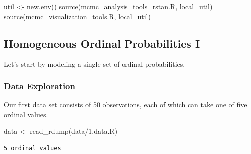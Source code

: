 \documentclass[
  letterpaper,
  DIV=11,
  numbers=noendperiod]{scrartcl}
\newenvironment{Shaded}{\begin{snugshade}}{\end{snugshade}}
\newcommand{\AttributeTok}[1]{\textcolor[rgb]{0.40,0.45,0.13}{#1}}
\newcommand{\FunctionTok}[1]{\textcolor[rgb]{0.28,0.35,0.67}{#1}}
\newcommand{\NormalTok}[1]{\textcolor[rgb]{0.00,0.23,0.31}{#1}}
\newcommand{\OtherTok}[1]{\textcolor[rgb]{0.00,0.23,0.31}{#1}}
\newcommand{\SpecialCharTok}[1]{\textcolor[rgb]{0.37,0.37,0.37}{#1}}
\newcommand{\StringTok}[1]{\textcolor[rgb]{0.13,0.47,0.30}{#1}}
\begin{document}
\begin{Shaded}
\begin{Highlighting}[]
\NormalTok{util }\OtherTok{\textless{}{-}} \FunctionTok{new.env}\NormalTok{()}
\FunctionTok{source}\NormalTok{(}\StringTok{\textquotesingle{}mcmc\_analysis\_tools\_rstan.R\textquotesingle{}}\NormalTok{, }\AttributeTok{local=}\NormalTok{util)}
\FunctionTok{source}\NormalTok{(}\StringTok{\textquotesingle{}mcmc\_visualization\_tools.R\textquotesingle{}}\NormalTok{, }\AttributeTok{local=}\NormalTok{util)}
\end{Highlighting}
\end{Shaded}

\subsection{Homogeneous Ordinal Probabilities
I}\label{homogeneous-ordinal-probabilities-i}

Let's start by modeling a single set of ordinal probabilities.

\subsubsection{Data Exploration}\label{data-exploration}

Our first data set consists of 50 observations, each of which can take
one of five ordinal values.

\begin{Shaded}
\begin{Highlighting}[]
\NormalTok{data }\OtherTok{\textless{}{-}} \FunctionTok{read\_rdump}\NormalTok{(}\StringTok{\textquotesingle{}data/1.data.R\textquotesingle{}}\NormalTok{)}
\end{Highlighting}
\end{Shaded}

\begin{Shaded}
\end{Shaded}

\begin{verbatim}
5 ordinal values
\end{verbatim}

\begin{Shaded}
\end{Shaded}
\end{document}
